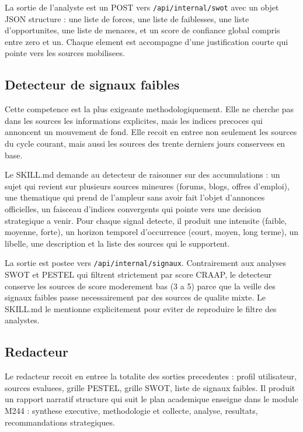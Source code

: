\documentclass[12pt,a4paper,openany]{report}
\begin{document}
La sortie de l'analyste est un POST vers \texttt{/api/internal/swot} avec un objet JSON structure : une liste de forces, une liste de faiblesses, une liste d'opportunites, une liste de menaces, et un score de confiance global compris entre zero et un. Chaque element est accompagne d'une justification courte qui pointe vers les sources mobilisees.

\subsection{Detecteur de signaux faibles}
\label{sec:skill-signaux}

Cette competence est la plus exigeante methodologiquement. Elle ne cherche pas dans les sources les informations explicites, mais les indices precoces qui annoncent un mouvement de fond. Elle recoit en entree non seulement les sources du cycle courant, mais aussi les sources des trente derniers jours conservees en base.

Le SKILL.md demande au detecteur de raisonner sur des accumulations : un sujet qui revient sur plusieurs sources mineures (forums, blogs, offres d'emploi), une thematique qui prend de l'ampleur sans avoir fait l'objet d'annonces officielles, un faisceau d'indices convergents qui pointe vers une decision strategique a venir. Pour chaque signal detecte, il produit une intensite (faible, moyenne, forte), un horizon temporel d'occurrence (court, moyen, long terme), un libelle, une description et la liste des sources qui le supportent.

La sortie est postee vers \texttt{/api/internal/signaux}. Contrairement aux analyses SWOT et PESTEL qui filtrent strictement par score CRAAP, le detecteur conserve les sources de score moderement bas (3 a 5) parce que la veille des signaux faibles passe necessairement par des sources de qualite mixte. Le SKILL.md le mentionne explicitement pour eviter de reproduire le filtre des analystes.

\subsection{Redacteur}
\label{sec:skill-redacteur}

Le redacteur recoit en entree la totalite des sorties precedentes : profil utilisateur, sources evaluees, grille PESTEL, grille SWOT, liste de signaux faibles. Il produit un rapport narratif structure qui suit le plan academique enseigne dans le module M244 : synthese executive, methodologie et collecte, analyse, resultats, recommandations strategiques.
\end{document}
